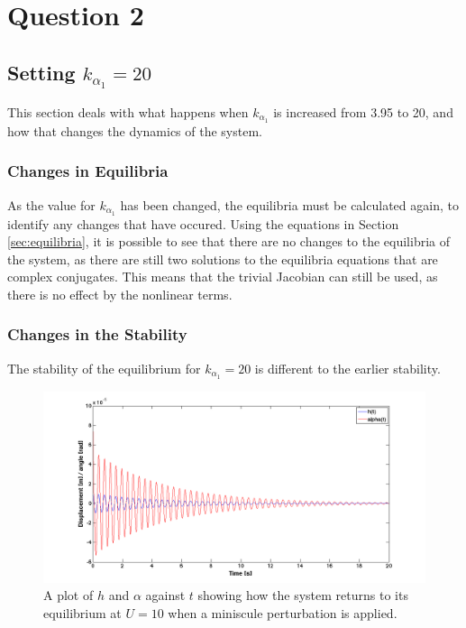 \section{Question 2}

\subsection{Setting $k_{\alpha_{1}}=20$}
This section deals with what happens when $k_{\alpha_{1}}$ is increased from 3.95 to 20, and how that changes the dynamics of the system. 

\subsubsection{Changes in Equilibria}

As the value for $k_{\alpha_{1}}$ has been changed, the equilibria must be calculated again, to identify any changes that have occured. Using the equations in Section \ref{sec:equilibria}, it is possible to see that there are no changes to the equilibria of the system, as there are still two solutions to the equilibria equations that are complex conjugates. This means that the trivial Jacobian can still be used, as there is no effect by the nonlinear terms. 

\subsubsection{Changes in the Stability}

The stability of the equilibrium for $k_{\alpha_{1}}=20$ is different to the earlier stability. 

\begin{figure}[H]
\centering
\includegraphics[width=1.0\textwidth]{k20attract.png}
\caption{\label{fig:k20attract} A plot of $h$ and $\alpha$ against $t$ showing how the system returns to its equilibrium at $U=10$ when a miniscule perturbation is applied.  }
\end{figure}

